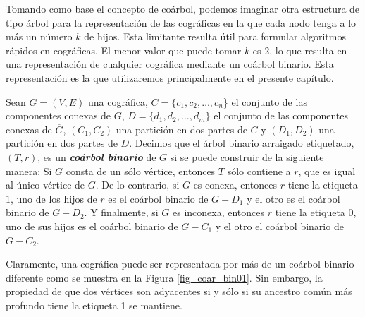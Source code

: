 Tomando como base el concepto de coárbol, podemos imaginar otra estructura de
tipo árbol para la representación de las cográficas en la que cada nodo tenga a
lo más un número $k$ de hijos. Esta limitante resulta útil para formular
algoritmos rápidos en cográficas. El menor valor que puede tomar $k$ es 2,
lo que resulta en una representaci\'on de cualquier cogr\'afica
mediante un co\'arbol binario.   Esta representaci\'on es la
que utilizaremos principalmente en el presente cap\'itulo.

Sean $G=(V,E)$ una cográfica, $C = \{c_1, c_2, \dots, c_n$\} el conjunto de
las componentes conexas de $G$, $D = \{d_1, d_2, \dots, d_m\}$ el conjunto
de las componentes conexas de $\overline{G}$, $(C_1, C_2)$ una partición en
dos partes de $C$ y $(D_1, D_2)$ una partición en dos partes de $D$. Decimos
que el árbol binario arraigado etiquetado, $(T,r)$, es un
\textbf{\emph{coárbol binario}} de $G$ si se puede construir de la siguiente
manera: Si $G$ consta de un sólo vértice, entonces $T$ sólo contiene a $r$,
que es igual al único vértice de $G$.
De lo contrario, si $G$ es conexa, entonces $r$ tiene la etiqueta $1$, uno
de los hijos de $r$ es el coárbol binario de $G-D_1$ y el otro es el coárbol
binario de $G-D_2$. Y finalmente, si $G$ es inconexa, entonces $r$ tiene la
etiqueta $0$, uno de sus hijos es el coárbol binario de $G-C_1$ y el otro el
coárbol binario de $G-C_2$.

Claramente, una cográfica puede ser representada por más de un coárbol binario
diferente como se muestra en la Figura \ref{fig_coar_bin01}. Sin embargo, la
propiedad de que dos vértices son adyacentes si y sólo si su ancestro común más
profundo tiene la etiqueta 1 se mantiene.

